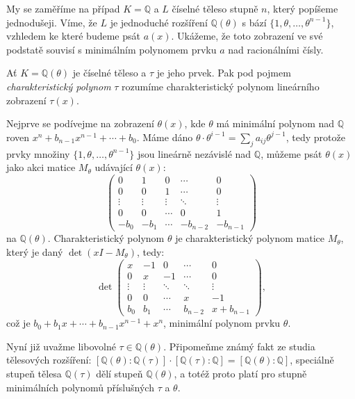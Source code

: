 \documentclass[12pt]{report}
\begin{document}
My se zaměříme na případ $K=\mathbb{Q}$ a $L$ číselné těleso stupně $n$, který popíšeme jednodušeji. Víme, že $L$ je jednoduché rozšíření $\mathbb{Q}(\theta)$ s bází $\lbrace 1,\theta,\dots,\theta^{n-1} \rbrace$, vzhledem ke které budeme psát $a(x)$. Ukážeme, že toto zobrazení ve své podstatě souvisí s minimálním polynomem prvku $a$ nad racionálními čísly.

\begin{definice}
Ať $K = \mathbb{Q}(\theta)$ je číselné těleso a $\tau$ je jeho prvek. Pak pod pojmem \textit{charakteristický polynom} $\tau$ rozumíme charakteristický polynom lineárního zobrazení $\tau(x)$. 
\end{definice}

Nejprve se podívejme na zobrazení $\theta(x)$, kde $\theta$ má minimální polynom nad $\mathbb{Q}$ roven $x^n + b_{n-1} x^{n-1} + \cdots + b_0$. Máme dáno $\theta \cdot \theta^{i-1} = \sum_j a_{ij} \theta^{j-1}$, tedy protože prvky množiny $\lbrace 1,\theta,\dots,\theta^{n-1} \rbrace$ jsou lineárně nezávislé nad $\mathbb{Q}$, můžeme psát $\theta(x)$ jako akci matice $M_{\theta}$ udávající $\theta(x)$:
\begin{equation*}
 \begin{pmatrix}
0 & 1 & 0 & \cdots & 0\\
0 & 0 & 1 & \cdots & 0\\
\vdots & \vdots & \vdots & \ddots &\vdots\\
0 & 0 & \cdots & 0& 1\\
-b_0 & -b_1 & \cdots & -b_{n-2} & -b_{n-1}
\end{pmatrix} 
\end{equation*}
na $\mathbb{Q}(\theta)$. Charakteristický polynom $\theta$ je charakteristický polynom matice $M_\theta$, který je daný $\det (x I - M_{\theta})$,  tedy:
\begin{equation*}
 \det \begin{pmatrix}
x & -1 & 0 & \cdots & 0\\
0 & x & -1 & \cdots & 0\\
\vdots & \vdots & \ddots & \ddots &\vdots\\
0 & 0 & \cdots & x& -1\\
b_0 & b_1 & \cdots & b_{n-2} & x +b_{n-1}
\end{pmatrix} ,
\end{equation*}
což je $b_0 + b_1 x + \cdots + b_{n-1} x^{n-1} + x^n$, minimální polynom prvku $\theta$.

Nyní již uvažme libovolné $ \tau \in \mathbb{Q}(\theta)$. Připomeňme známý fakt ze studia tělesových rozšíření: $[\mathbb{Q}(\theta) : \mathbb{Q}(\tau)] \cdot [\mathbb{Q}(\tau) : \mathbb{Q}] = [\mathbb{Q}(\theta) : \mathbb{Q}]$, speciálně stupeň tělesa $\mathbb{Q}(\tau)$ dělí stupeň $\mathbb{Q}(\theta)$, a totéž proto platí pro stupně minimálních polynomů příslušných $\tau$ a $\theta$.
\end{document}
